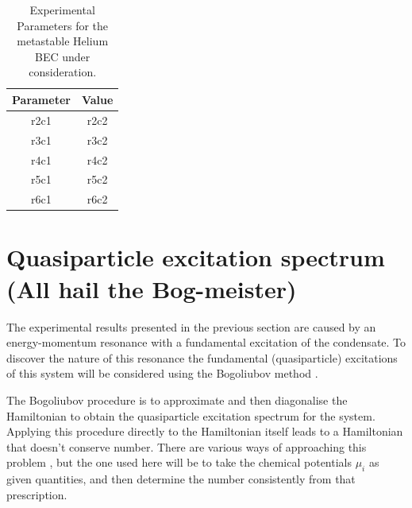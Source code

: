 \begin{table}
    \centering
    \begin{tabular}{cc}
    \toprule
    Parameter & Value\\
    \midrule
    r2c1 & r2c2\\
    r3c1 & r3c2\\
    r4c1 & r4c2\\
    r5c1 & r5c2\\
    r6c1 & r6c2\\
    \bottomrule
    \end{tabular}
    \caption{Experimental Parameters for the metastable Helium BEC under consideration.}
    \label{Peaks:ExperimentalParameters}
\end{table}





\section{Quasiparticle excitation spectrum (All hail the Bog-meister)}


The experimental results presented in the previous section are caused by an energy-momentum resonance with a fundamental excitation of the condensate. To discover the nature of this resonance the fundamental (quasiparticle) excitations of this system will be considered using the Bogoliubov method \citep{Bogoliubov:1947}.

The Bogoliubov procedure \citep{Bogoliubov:1947} is to approximate and then diagonalise the Hamiltonian to obtain the quasiparticle excitation spectrum for the system. Applying this procedure directly to the Hamiltonian itself leads to a Hamiltonian that doesn't conserve number. There are various ways of approaching this problem \citep{FetterWalecka}, but the one used here will be to take the chemical potentials $\mu_i$ as given quantities, and then determine the number consistently from that prescription.

